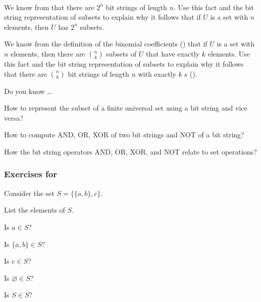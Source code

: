 \begin{exer}[\exerU] %
\label{exer_count_subsets}
~ 
    \begin{exerpart}
        \item We know from  that there are $2^n$ bit strings of length $n$. Use this fact and the bit string representation of subsets to explain why it follows that if $U$ is a set with $n$ elements, then $U$ has $2^n$ subsets.
        \item We know from the definition of the binomial coefficients () that if $U$ is a set with $n$ elements, then there are $\binom{n}{k}$ subsets of $U$ that have exactly $k$ elements.  Use this fact and the bit string representation of subsets to explain why it follows that there are $\binom{n}{k}$ bit strings of length $n$ with exactly $k$ s ().
    \end{exerpart}
\end{exer}

\begin{exer}[\exerR] %
\label{exer_dyk_bs_rep_subsets}
    Do you know \ldots
        \begin{exerpart}
            \item How to represent the subset of a finite universal set using a bit string and vice versa?
            \item How to compute AND, OR, XOR of two bit strings and NOT of a bit string?
            \item How the bit string operators AND, OR, XOR, and NOT relate to set operations? 
        \end{exerpart}
\end{exer}


\subsubsection*{Exercises for 
\subsetsofsets}

\begin{exer}[\exerP] %
\label{exer_set_of_sets_elements}
    Consider the set $S= \{\{a,b\},c\}$. 
        \begin{exerpart}
        \item List the elements of $S$.
        \item Is $a \in S$?
        \item Is $\{a,b\}\in S$?
        \item  Is $c \in S$?
        \item Is $\varnothing \in S$?
        \item Is $S \in S$?
    \end{exerpart}
\end{exer}

